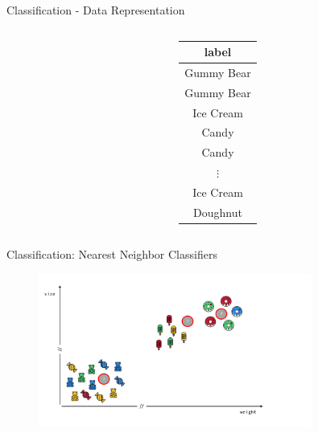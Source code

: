 \documentclass[aspectratio=169]{beamer}
\begin{document}
\begin{frame}{Classification - Data Representation}
\begin{columns}
\begin{column}{0.8\textwidth}
\begin{tabularx}{0.8\textwidth}{@{}c|Y|Y|Y|Y@{}}
                \bottomrule
            \end{tabularx}
        \end{column}
        \begin{column}{0.3\textwidth}
            \begin{tabular}{c}
                \toprule
                \textbf{label}  \\
                \midrule
                Gummy Bear   \\
                \midrule
                 Gummy Bear   \\
                \midrule
                Ice Cream   \\
                \midrule
                Candy   \\
                \midrule
                Candy   \\
                \midrule
                $\vdots$  \\
                \midrule
                Ice Cream   \\
                \midrule
                 Doughnut   \\
                \bottomrule
            \end{tabular}
        \end{column}
    \end{columns}

\end{frame}

\begin{frame}{Classification: Nearest Neighbor Classifiers}
    \begin{figure}
        \centering
        \includegraphics[width=0.8\textwidth]{figures/example_kNN.pdf}
    \end{figure}
\end{frame}
\end{document}
